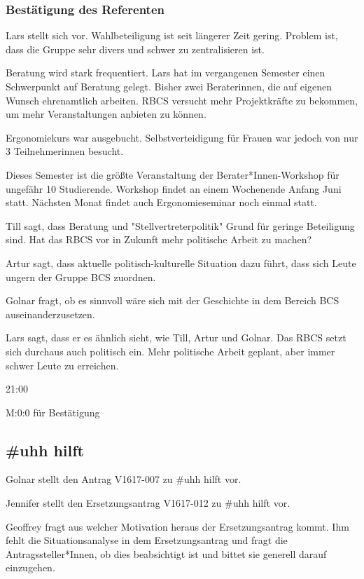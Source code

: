 \documentclass[ngerman,headheight=70pt]{scrartcl}
\begin{document}
    \subsubsection{Bestätigung des Referenten}

    Lars stellt sich vor. Wahlbeteiligung ist seit längerer Zeit gering.
    Problem ist, dass die Gruppe sehr divers und schwer zu zentralisieren
    ist.

    Beratung wird stark frequentiert. Lars hat im vergangenen Semester
    einen Schwerpunkt auf Beratung gelegt. Bisher zwei Beraterinnen,
    die auf eigenen Wunsch ehrenamtlich arbeiten. RBCS versucht mehr
    Projektkräfte zu bekommen, um mehr Veranstaltungen anbieten zu können.

    Ergonomiekurs war ausgebucht. Selbstverteidigung für Frauen war jedoch
    von nur 3 Teilnehmerinnen besucht.

    Dieses Semester ist die größte Veranstaltung der Berater*Innen-Workshop
    für ungefähr 10 Studierende. Workshop findet an einem Wochenende
    Anfang Juni statt. Nächsten Monat findet auch Ergonomieseminar noch einmal
    statt.

    Till sagt, dass Beratung und "Stellvertreterpolitik" Grund für geringe
    Beteiligung sind. Hat das RBCS vor in Zukunft mehr politische Arbeit
    zu machen?

    Artur sagt, dass aktuelle politisch-kulturelle Situation dazu führt, dass
    sich Leute ungern der Gruppe BCS zuordnen.

    Golnar fragt, ob es sinnvoll wäre sich mit der Geschichte in dem Bereich
    BCS auseinanderzusetzen.

    Lars sagt, dass er es ähnlich sieht, wie Till, Artur und Golnar. Das RBCS
    setzt sich durchaus auch politisch ein. Mehr politische Arbeit
    geplant, aber immer schwer Leute zu erreichen.

    21:00

    M:0:0 für Bestätigung

    \subsection{\#uhh hilft}

    Golnar stellt den Antrag V1617-007 zu \#uhh hilft vor.

    Jennifer stellt den Ersetzungsantrag V1617-012 zu \#uhh hilft vor.

    Geoffrey fragt aus welcher Motivation heraus der Ersetzungsantrag kommt.
    Ihm fehlt die Situationsanalyse in dem Ersetzungsantrag und fragt die
    Antragssteller*Innen, ob dies beabsichtigt ist und bittet sie generell
    darauf einzugehen.
\end{document}
